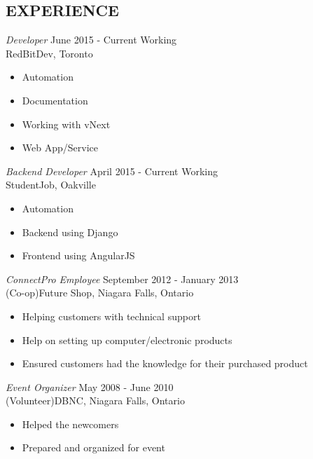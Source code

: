 \documentclass[margin, 10pt]{res} %
\begin{document}
\begin{resume}

\section{EXPERIENCE}
{\sl Developer} \hfill June 2015 - Current Working \\
RedBitDev, Toronto %

\begin{itemize} \itemsep -2pt %
    \item Automation
    \item Documentation
    \item Working with vNext
    \item Web App/Service
\end{itemize}

{\sl Backend Developer} \hfill April 2015 - Current Working \\
StudentJob, Oakville %

\begin{itemize} \itemsep -2pt %
    \item Automation
    \item Backend using Django
    \item Frontend using AngularJS
\end{itemize}

\newpage

{\sl ConnectPro Employee} \hfill September 2012 - January 2013 \\
(Co-op)Future Shop, Niagara Falls, Ontario

\begin{itemize} \itemsep -2pt %
    \item Helping customers with technical support
    \item Help on setting up computer/electronic products
    \item Ensured customers had the knowledge for their purchased product
\end{itemize}

{\sl Event Organizer} \hfill May 2008 - June 2010 \\
(Volunteer)DBNC, Niagara Falls, Ontario

\begin{itemize} \itemsep -2pt %
    \item Helped the newcomers
    \item Prepared and organized for event
\end{itemize}


\end{resume}
\end{document}
